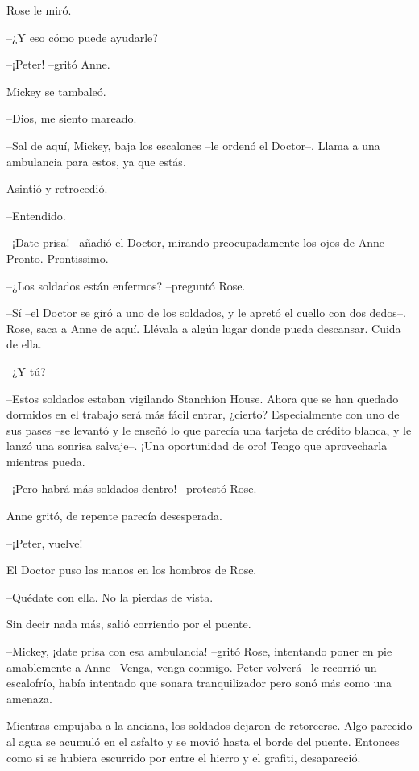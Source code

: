 {Rose le miró.}

{--¿Y eso cómo puede ayudarle?}

{--¡Peter! --gritó Anne.}

{Mickey se tambaleó.}

{--Dios, me siento mareado.}

{--Sal de aquí, Mickey, baja los escalones --le ordenó el Doctor--.
Llama a una ambulancia para estos, ya que estás.}

{Asintió y retrocedió.}

{--Entendido.}

{--¡Date prisa! --añadió el Doctor, mirando preocupadamente los ojos de
Anne-- Pronto. Prontissimo.}

{--¿Los soldados están enfermos? --preguntó Rose.}

{--Sí --el Doctor se giró a uno de los soldados, y le apretó el cuello
 con dos dedos--. Rose, saca a Anne de aquí. Llévala a algún lugar donde
pueda descansar. Cuida de ella.}

{--¿Y tú?}

{--Estos soldados estaban vigilando Stanchion House. Ahora que se han
 quedado dormidos en el trabajo será más fácil entrar, ¿cierto?
 Especialmente con uno de sus pases --se levantó y le enseñó lo que
 parecía una tarjeta de crédito blanca, y le lanzó una sonrisa salvaje--.
¡Una oportunidad de oro! Tengo que aprovecharla mientras pueda.}

{--¡Pero habrá más soldados dentro! --protestó Rose.}

{Anne gritó, de repente parecía desesperada.}

{--¡Peter, vuelve!}

{El Doctor puso las manos en los hombros de Rose.}

{--Quédate con ella. No la pierdas de vista.}

{Sin decir nada más, salió corriendo por el puente.}

{--Mickey, ¡date prisa con esa ambulancia! --gritó Rose, intentando
 poner en pie amablemente a Anne-- Venga, venga conmigo. Peter volverá
 --le recorrió un escalofrío, había intentado que sonara tranquilizador
pero sonó más como una amenaza.}

{Mientras empujaba a la anciana, los soldados dejaron de retorcerse.
 Algo parecido al agua se acumuló en el asfalto y se movió hasta el borde
 del puente. Entonces como si se hubiera escurrido por entre el hierro y
el grafiti, desapareció.}
